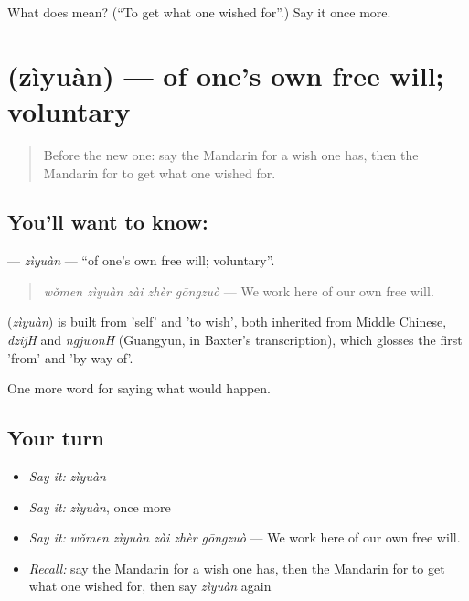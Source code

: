\begin{tcolorbox}[breakable,colback=teal!4,colframe=teal!35!black,title={Before you move on}]
What does  mean? (\textquotedblleft{}To get what one wished for\textquotedblright{}.) Say it once more.
\end{tcolorbox}
\section[\texorpdfstring{\zh{自愿} (zìyuàn)}{自愿 (zìyuàn)}]{ (zìyuàn) — of one's own free will; voluntary}

\label{lesson:ZH-C535-ziyuan}



\begin{quote}
Before the new one: say the Mandarin for a wish one has, then the Mandarin for to get what one wished for.
\end{quote}

\subsection*{You'll want to know: }
\textbf{} — \emph{zìyuàn} — \textquotedblleft{}of one's own free will; voluntary\textquotedblright{}.

\begin{quote}
\textbf{} \emph{wǒmen zìyuàn zài zhèr gōngzuò} — We work here of our own free will.
\end{quote}

\begin{cousinweb}
\textbf{} (\emph{zìyuàn}) is built from  'self' and  'to wish', both inherited from Middle Chinese, \emph{dzijH} and \emph{ngjwonH} (Guangyun, in Baxter's transcription), which glosses the first 'from' and 'by way of'.
\end{cousinweb}

\begin{grammarlens}[title={What you've built}]
One more word for saying what would happen.
\end{grammarlens}

\subsection*{Your turn}
\begin{itemize}
\raggedright
  \item \emph{Say it:} \emph{zìyuàn}
  \item \emph{Say it:} \emph{zìyuàn}, once more
  \item \emph{Say it:} \emph{wǒmen zìyuàn zài zhèr gōngzuò} — We work here of our own free will.
  \item \emph{Recall:} say the Mandarin for a wish one has, then the Mandarin for to get what one wished for, then say \emph{zìyuàn} again
\end{itemize}

